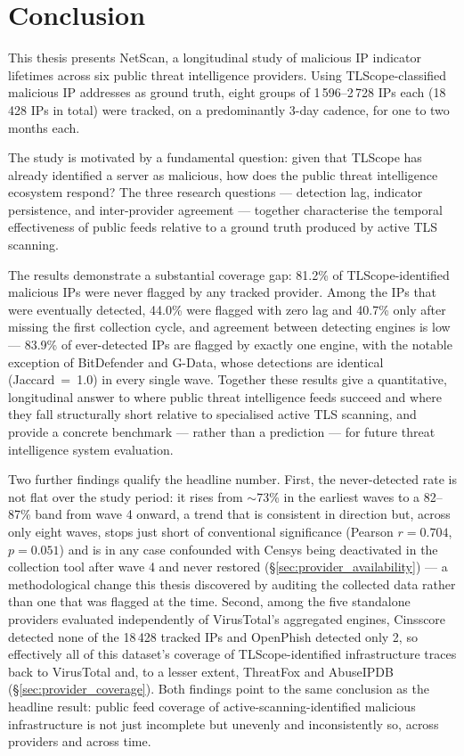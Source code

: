 \documentclass[12pt, a4paper, twoside]{report}
\begin{document}
\chapter{Conclusion}
\label{ch:conclusion}

This thesis presents NetScan, a longitudinal study of malicious IP indicator lifetimes across six
public threat intelligence providers. Using TLScope-classified malicious IP addresses as ground
truth, eight groups of 1\,596--2\,728 IPs each (18\,428 IPs in total) were tracked, on a
predominantly 3-day cadence, for one to two months each.

The study is motivated by a fundamental question: given that TLScope has already identified a
server as malicious, how does the public threat intelligence ecosystem respond? The three research
questions --- detection lag, indicator persistence, and inter-provider agreement --- together
characterise the temporal effectiveness of public feeds relative to a ground truth produced by
active TLS scanning.

The results demonstrate a substantial coverage gap: 81.2\% of TLScope-identified malicious IPs were
never flagged by any tracked provider. Among the IPs that were eventually detected, 44.0\% were
flagged with zero lag and 40.7\% only after missing the first collection cycle, and agreement
between detecting engines is low --- 83.9\% of ever-detected IPs are flagged by exactly one engine,
with the notable exception of BitDefender and G-Data, whose detections are identical
(Jaccard~=~1.0) in every single wave. Together these results give a quantitative, longitudinal
answer to where public threat intelligence feeds succeed and where they fall structurally short
relative to specialised active TLS scanning, and provide a concrete benchmark --- rather than a
prediction --- for future threat intelligence system evaluation.

Two further findings qualify the headline number. First, the never-detected rate is not flat over
the study period: it rises from $\sim$73\% in the earliest waves to a 82--87\% band from wave
4 onward, a trend that is consistent in direction but, across only eight waves, stops just short of
conventional significance (Pearson $r = 0.704$, $p = 0.051$) and is in any case confounded with
Censys being deactivated in the collection tool after wave 4 and never restored
(\S\ref{sec:provider_availability}) --- a methodological change this thesis discovered by auditing
the collected data rather than one that was flagged at the time. Second, among the five standalone
providers evaluated independently of VirusTotal's aggregated engines, Cinsscore detected none of the
18\,428 tracked IPs and OpenPhish detected only 2, so effectively all of this dataset's coverage of
TLScope-identified infrastructure traces back to VirusTotal and, to a lesser extent, ThreatFox and
AbuseIPDB (\S\ref{sec:provider_coverage}). Both findings point to the same conclusion as the
headline result: public feed coverage of active-scanning-identified malicious infrastructure is not
just incomplete but unevenly and inconsistently so, across providers and across time.
\end{document}
